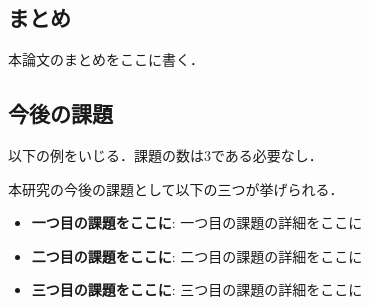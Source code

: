 \subsection{まとめ}
本論文のまとめをここに書く．

\subsection{今後の課題}
以下の例をいじる．課題の数は3である必要なし．

\vspace{10truemm}
本研究の今後の課題として以下の三つが挙げられる．

\begin{itemize}
    \item {\bf 一つ目の課題をここに}: 一つ目の課題の詳細をここに
    \item {\bf 二つ目の課題をここに}: 二つ目の課題の詳細をここに
    \item {\bf 三つ目の課題をここに}: 三つ目の課題の詳細をここに
\end{itemize}